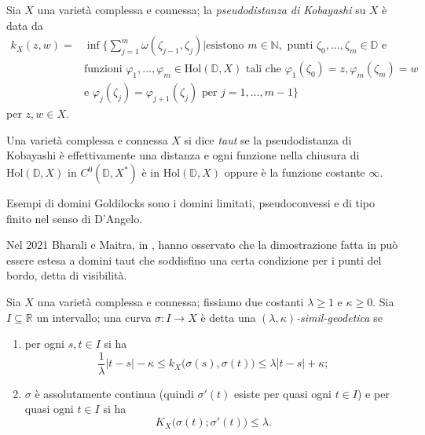 \begin{defn}
    Sia $X$ una varietà complessa e connessa; la \textit{pseudodistanza di Kobayashi} su $X$ è data da
    \begin{align*}
        k_X(z,w)=&\inf\Bigg\{\sum_{j=1}^m \omega(\zeta_{j-1},\zeta_j) \bigg\vert \text{esistono }m\in\mathbb{N},\text{ punti }\zeta_0,\dots,\zeta_m \in \mathbb{D}\text{ e}\\
        &\text{funzioni }\varphi_1,\dots,\varphi_m\in\text{Hol}(\mathbb{D},X) \text{ tali che } \varphi_1(\zeta_0)=z,\varphi_m(\zeta_m)=w\\
        &\text{e }\varphi_j(\zeta_j)=\varphi_{j+1}(\zeta_j)\text{ per }j=1,\dots,m-1\Bigg\}
    \end{align*}
    per $z,w \in X$.
\end{defn}

\begin{defn}
    Una varietà complessa e connessa $X$ si dice \textit{taut} se la pseudodistanza di Kobayashi è effettivamente una distanza e ogni funzione nella chiusura di $\text{Hol}(\mathbb{D},X)$ in $C^0(\mathbb{D},X^*)$ è in $\text{Hol}(\mathbb{D},X)$ oppure è la funzione costante $\infty$.
\end{defn}

Esempi di domini Goldilocks sono i domini limitati, pseudoconvessi e di tipo finito nel senso di D'Angelo.

Nel 2021 Bharali e Maitra, in \cite{BM}, hanno osservato che la dimostrazione fatta in \cite{BZ1} può essere estesa a domini taut che soddisfino una certa condizione per i punti del bordo, detta di visibilità.

\begin{defn}
    Sia $X$ una varietà complessa e connessa; fissiamo due costanti $\lambda \ge 1$ e $\kappa \ge 0$. Sia $I\subseteq \mathbb{R}$ un intervallo; una curva $\sigma:I \longrightarrow X$ è detta una \textit{$(\lambda,\kappa)$-simil-geodetica} se
    \begin{enumerate}
        \item per ogni $s,t \in I$ si ha
        $$\frac{1}{\lambda}|t-s|-\kappa \le k_X\big(\sigma(s),\sigma(t)\big)\le\lambda|t-s|+\kappa;$$
        \item $\sigma$ è assolutamente continua (quindi $\sigma'(t)$ esiste per quasi ogni $t \in I$) e per quasi ogni $t \in I$ si ha
        $$K_X\big(\sigma(t);\sigma'(t)\big) \le \lambda.$$
    \end{enumerate}
\end{defn}


